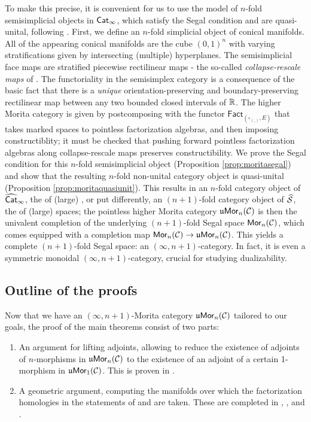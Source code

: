 \documentclass[10pt, reqno, twoside
, final
]{amsart}
\numberwithin{equation}{subsection}%
\theoremstyle{definition}
\theoremstyle{definition}
\theoremstyle{definition}
\theoremstyle{definition}
\theoremstyle{definition}
\theoremstyle{definition}
\theoremstyle{definition}
\theoremstyle{definition}
\theoremstyle{definition}
\theoremstyle{plain}
\theoremstyle{definition}
\theoremstyle{plain}
\theoremstyle{definition}
\theoremstyle{plain}
\theoremstyle{definition}
\theoremstyle{definition}
\theoremstyle{plain}
\theoremstyle{plain}
\theoremstyle{definition}
\theoremstyle{plain}
\theoremstyle{plain}
\theoremstyle{plain}
\begin{document}
To make this precise, it is convenient for us to use the model 
of $n$-fold semisimplicial objects in $\mathsf{Cat}_{\infty}$, which satisfy the Segal condition and are quasi-unital, following \cite{Haugseng_quasi}.
First, we define an $n$-fold simplicial object of conical manifolds. All of the appearing conical manifolds are the cube $(0,1)^n$ with varying stratifications given by intersecting (multiple) hyperplanes. The semisimplicial face maps are stratified piecewise rectilinear maps - the so-called \emph{collapse-rescale maps} of \cite{Scheimbauer}. The functoriality in the semisimplex category is a consequence of the basic fact that there is a \emph{unique} orientation-preserving and boundary-preserving rectilinear map between any two bounded closed intervals of $\mathbb{R}$. The higher Morita category is given by postcomposing with the functor $\mathsf{Fact}_{(\square_{(\_)},E)}$ that takes marked spaces to pointless factorization algebras, and then imposing constructiblity; it must be checked that pushing forward pointless factorization algebras along collapse-rescale maps preserves constructibility. We prove the Segal condition for this $n$-fold semisimplicial object (Proposition \ref{prop:moritasegal}) and show that the resulting $n$-fold non-unital category object is quasi-unital (Proposition \ref{prop:moritaquasiunit}). This results in an $n$-fold category object of $\widehat{\mathsf{Cat}}_{\infty}$, the \infcat of (large) \infcatst, or put differently, an $(n+1)$-fold category object of $\widehat{\mathcal{S}}$, the \infcat of (large) spaces; the pointless higher Morita category $\mathfrak{u}\mathsf{Mor}_n(\mathcal{C})$ is then the univalent completion of the underlying $(n+1)$-fold Segal space $\mathsf{Mor}_n(\mathcal{C})$, which comes equipped with a completion map $\mathsf{Mor}_n(\mathcal{C})\rightarrow \mathfrak{u}\mathsf{Mor}_n(\mathcal{C})$. This yields a complete $(n+1)$-fold Segal space: an $(\infty,n+1)$-category. In fact, it is even a symmetric monoidal  $(\infty,n+1)$-category, crucial for studying dualizability.


\subsection{Outline of the proofs}

Now that we have an $(\infty,n+1)$-Morita category $\mathfrak{u}\mathsf{Mor}_n(\mathcal{C})$ tailored to our goals, the proof of the main theorems consist of two parts:
\begin{enumerate}
    \item An argument for lifting adjoints, allowing to reduce the existence of adjoints of $n$-morphisms in $\mathfrak{u}\mathsf{Mor}_n(\mathcal{C})$ to the existence of an adjoint of a certain 1-morphism in $\mathfrak{u}\mathsf{Mor}_1(\mathcal{C})$. This is proven in .
    \item A geometric argument, computing the manifolds over which the factorization homologies in the statements of  and  are taken. These are completed in , , and .
\end{enumerate}
\end{document}

